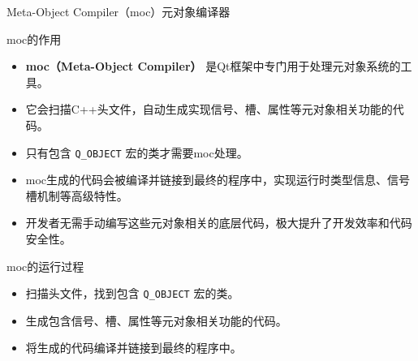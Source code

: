 \documentclass[UTF8,aspectratio=169]{beamer}
\begin{document}
\begin{frame}{Meta-Object Compiler（moc）元对象编译器}
    \begin{ytublock}{moc的作用}
        \begin{itemize}
            \item \textbf{moc（Meta-Object Compiler）} 是Qt框架中专门用于处理元对象系统的工具。
            \item 它会扫描C++头文件，自动生成实现信号、槽、属性等元对象相关功能的代码。
            \item 只有包含 \texttt{Q\_OBJECT} 宏的类才需要moc处理。
            \item moc生成的代码会被编译并链接到最终的程序中，实现运行时类型信息、信号槽机制等高级特性。
            \item 开发者无需手动编写这些元对象相关的底层代码，极大提升了开发效率和代码安全性。
        \end{itemize}
    \end{ytublock}
    \begin{ytublock}{moc的运行过程}
        \begin{itemize}
            \item 扫描头文件，找到包含 \texttt{Q\_OBJECT} 宏的类。
            \item 生成包含信号、槽、属性等元对象相关功能的代码。
            \item 将生成的代码编译并链接到最终的程序中。
        \end{itemize}
    \end{ytublock}
\end{frame}
\end{document}
